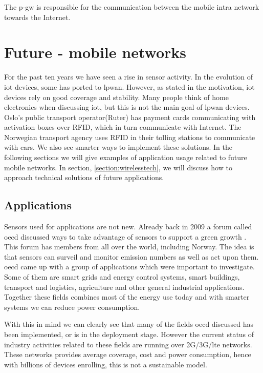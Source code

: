 \documentclass[USenglish]{ifimaster}  %
\begin{document}
The \acrshort{p-gw} is responsible for the communication between the mobile intra network towards the Internet.

\section{Future - mobile networks} \label{section:futureapplications}
For the past ten years we have seen a rise in sensor activity. In the evolution of \acrshort{iot} devices, some has ported to \acrshort{lpwan}. However, as stated in the motivation, \acrshort{iot} devices rely on good coverage and stability. Many people think of home electronics when discussing \acrshort{iot}, but this is not the main goal of \acrshort{lpwan} devices. Oslo's public transport operator(Ruter) has payment cards communicating with activation boxes over RFID, which in turn communicate with Internet. The Norwegian transport agency uses RFID in their tolling stations to communicate with cars. We also see smarter ways to implement these solutions. In the following sections we will give examples of application usage related to future mobile networks. In section, \vref{section:wirelesstech}, we will discuss how to approach technical solutions of future applications.

\subsection{Applications} \label{ssection:applications}
Sensors used for applications are not new. Already back in 2009 a forum called \acrfull{oecd} discussed ways to take advantage of sensors to support a green growth \cite{online:industryApplications}. This forum has members from all over the world, including Norway. The idea is that sensors can surveil and monitor emission numbers as well as act upon them. \acrshort{oecd} came up with a group of applications which were important to investigate. Some of them are smart grids and energy control systems, smart buildings, transport and logistics, agriculture and other general industrial applications. Together these fields combines most of the energy use today and with smarter systems we can reduce power consumption.

With this in mind we can clearly see that many of the fields \acrshort{oecd} discussed has been implemented, or is in the deployment stage. However the current status of industry activities related to these fields are running over 2G/3G/\acrshort{lte} networks. These networks provides average coverage, cost and power consumption, hence with billions of devices enrolling, this is not a sustainable model.
\end{document}
